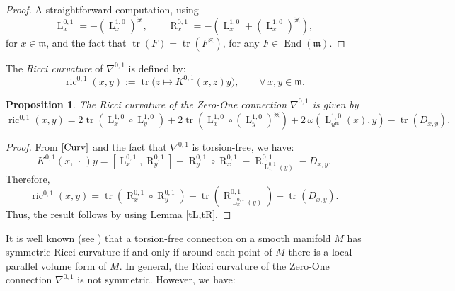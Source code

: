 \documentclass[preprint,12pt,1p]{elsarticle}
\theoremstyle{plain}
\newtheorem{proposition}[theorem]{Proposition}
\theoremstyle{definition}
\newcommand{\ro}{\circ}
\newcommand{\n}{\nabla}
\newcommand{\nc}{\n^{0,1}}
\newcommand{\tr}{\operatorname{tr}}
\newcommand{\End}{\operatorname{End}}
\newcommand{\m}{\mathfrak{m}}
\newcommand{\la}{\operatorname{L}^{0,1}}
\newcommand{\ra}{\operatorname{R}^{0,1}}
\newcommand{\lm}{\operatorname{L}^{1,0}}
\newcommand{\ric}{\operatorname{ric}}
\numberwithin{equation}{section}
\newcommand{\aj}{\divideontimes}
\newcommand{\Kc}{K^{0,1}}
\begin{document}
\begin{proof}
A straightforward computation, using
\begin{equation*}
\la_x=-\left(\lm_x\right)^\divideontimes,\qquad\ra_x=-\left(\lm_x+\left(\lm_x\right)^\divideontimes\right),
\end{equation*}
for $x\in\m$, and the fact that $\tr\left(F\right)=\tr\left(F^\aj\right)$, for any $F\in\End(\mathfrak{m})$.
\end{proof}

The \textit{Ricci curvature} of $\nc$ is defined by:
\begin{equation*}
\ric^{0,1}(x,y):=\tr\big(z\mapsto \Kc(x,z)y\big),\qquad\forall\,x,y\in\m.
\end{equation*}

\begin{proposition}
The Ricci curvature of the Zero-One connection $\nc$ is given by
\begin{equation}\label{RicA}
\ric^{0,1}(x,y)=2\tr\left(\lm_x\ro\lm_y\right)+2\tr\left(\lm_x\ro\left(\lm_y\right)^\aj\right)+2\,\omega\left(\lm_{u^\mathfrak{m}}(x),y\right)-\tr(D_{x,y}).
\end{equation}
\end{proposition}

\begin{proof} 
From $\eqref{Curv}$ and the fact that $\nc$ is torsion-free, we have:
\begin{equation}\label{CalRicA}
\Kc(x,\,\cdot\,)y=\left[\la_x,\ra_y\right]+\ra_y\ro\ra_x-\ra_{\la_x(y)}-D_{x,y}.
\end{equation}
Therefore,
\begin{equation*}
\ric^{0,1}(x,y)=\tr(\ra_x\ro\ra_y)-\tr(\ra_{\la_x(y)})-\tr(D_{x,y}).
\end{equation*}
Thus, the result follows by using Lemma \ref{tL,tR}.
\end{proof}

It is well known (see \cite[p. $14$]{Nom2}) that a torsion-free connection on a smooth manifold $M$ has symmetric Ricci curvature if and only if around each point of $M$ there is a local parallel volume form of $M$. In general, the Ricci curvature of the Zero-One connection $\nc$ is not symmetric. However, we have:
\end{document}
